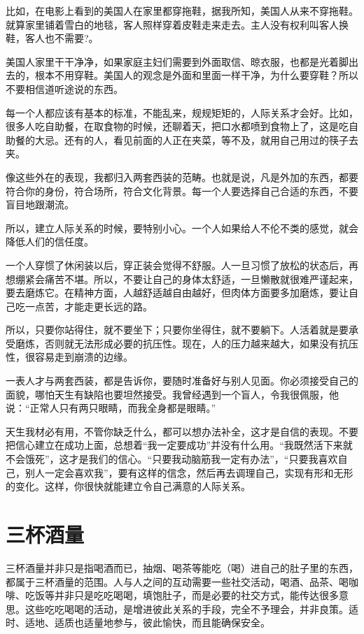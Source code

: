 \documentclass[fontset=fandol, a4paper, 12pt, openright]{ctexbook}
\begin{document}
比如，在电影上看到的美国人在家里都穿拖鞋，据我所知，美国人从来不穿拖鞋。就算家里铺着雪白的地毯，客人照样穿着皮鞋走来走去。主人没有权利叫客人换鞋，客人也不需要?。

美国人家里干干净净，如果家庭主妇们需要到外面取信、晾衣服，也都是光着脚出去的，根本不用穿鞋。美国人的观念是外面和里面一样干净，为什么要穿鞋？所以不要相信道听途说的东西。

每一个人都应该有基本的标准，不能乱来，规规矩矩的，人际关系才会好。比如，很多人吃自助餐，在取食物的时候，还聊着天，把口水都喷到食物上了，这是吃自助餐的大忌。还有的人，看见前面的人正在夹菜，等不及，就用自己用过的筷子去夹。

像这些外在的表现，我都归入两套西装的范畴。也就是说，凡是外加的东西，都要符合你的身份，符合场所，符合文化背景。每一个人要选择自己合适的东西，不要盲目地跟潮流。

所以，建立人际关系的时候，要特别小心。一个人如果给人不伦不类的感觉，就会降低人们的信任度。

一个人穿惯了休闲装以后，穿正装会觉得不舒服。人一旦习惯了放松的状态后，再想绷紧会痛苦不堪。所以，不要让自己的身体太舒适，一旦懒散就很难严谨起来，要去磨炼它。在精神方面，人越舒适越自由越好，但肉体方面要多加磨炼，要让自己吃一点苦，才能走更长远的路。

所以，只要你站得住，就不要坐下；只要你坐得住，就不要躺下。人活着就是要承受磨炼，否则就无法形成必要的抗压性。现在，人的压力越来越大，如果没有抗压性，很容易走到崩溃的边缘。

一表人才与两套西装，都是告诉你，要随时准备好与别人见面。你必须接受自己的面貌，哪怕天生有缺陷也要坦然接受。我曾经遇到一个盲人，令我很佩服，他说：“正常人只有两只眼睛，而我全身都是眼睛。”

天生我材必有用，不管你缺乏什么，都可以想办法补全，这才是自信的表现。不要把信心建立在成功上面，总想着“我一定要成功”并没有什么用。“我既然活下来就不会饿死”，这才是我们的信心。“只要我动脑筋我一定有办法”，“只要我喜欢自己，别人一定会喜欢我”，要有这样的信念，然后再去调理自己，实现有形和无形的变化。这样，你很快就能建立令自己满意的人际关系。


\chapter{三杯酒量}
三杯酒量并非只是指喝酒而已，抽烟、喝茶等能吃（喝）进自己的肚子里的东西，都属于三杯酒量的范围。人与人之间的互动需要一些社交活动，喝酒、品茶、喝咖啡、吃饭等并非只是吃吃喝喝，填饱肚子，而是必要的社交方式，能传达很多意思。这些吃吃喝喝的活动，是增进彼此关系的手段，完全不予理会，并非良策。适时、适地、适质也适量地参与，彼此愉快，而且能确保安全。
\end{document}

